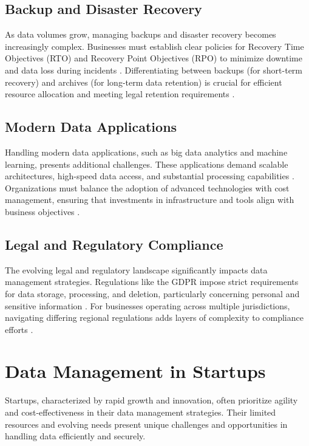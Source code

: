 \documentclass{article}
\begin{document}
\subsection*{Backup and Disaster Recovery}

As data volumes grow, managing backups and disaster recovery becomes increasingly complex. Businesses must establish clear policies for Recovery Time Objectives (RTO) and Recovery Point Objectives (RPO) to minimize downtime and data loss during incidents \cite{bci2018}. Differentiating between backups (for short-term recovery) and archives (for long-term data retention) is crucial for efficient resource allocation and meeting legal retention requirements \cite{igi2019}.

\subsection*{Modern Data Applications}

Handling modern data applications, such as big data analytics and machine learning, presents additional challenges. These applications demand scalable architectures, high-speed data access, and substantial processing capabilities \cite{mckinsey2018}. Organizations must balance the adoption of advanced technologies with cost management, ensuring that investments in infrastructure and tools align with business objectives \cite{forbes2019}.

\subsection*{Legal and Regulatory Compliance}

The evolving legal and regulatory landscape significantly impacts data management strategies. Regulations like the GDPR impose strict requirements for data storage, processing, and deletion, particularly concerning personal and sensitive information \cite{eu2016}. For businesses operating across multiple jurisdictions, navigating differing regional regulations adds layers of complexity to compliance efforts \cite{deloitte2020}.

\section*{Data Management in Startups}

Startups, characterized by rapid growth and innovation, often prioritize agility and cost-effectiveness in their data management strategies. Their limited resources and evolving needs present unique challenges and opportunities in handling data efficiently and securely.
\end{document}
